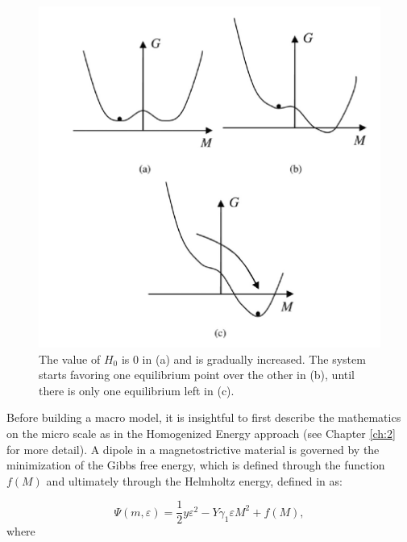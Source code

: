 \begin{multicols}{2}
\begin{figure}[H]
    \centering
    \includegraphics[scale=0.33]{._figures/austenitemartensite.png}
    \caption[Equilibria of the SMA energy function in a magnetic field]{The value of $H_0$ is 0 in (a) and is gradually increased. The system starts favoring one equilibrium point over the other in (b), until there is only one equilibrium left in (c). \cite{morris2011hysteresis}}
    \label{fig:austenitemartensite}
\end{figure}

Before building a macro model, it is insightful to first describe the mathematics on the micro scale as in the Homogenized Energy approach (see Chapter \ref{ch:2} for more detail). A dipole in a magnetostrictive material is governed by the minimization of the Gibbs free energy, which is defined through the function $f(M)$ and ultimately through the Helmholtz energy, defined in \cite{morris2011hysteresis} as:

\begin{equation}\label{111}
    \Psi(m,\varepsilon)=\frac{1}{2}y\varepsilon^2-Y\gamma_1\varepsilon M^2+f(M),
\end{equation}
where 


\end{multicols}
